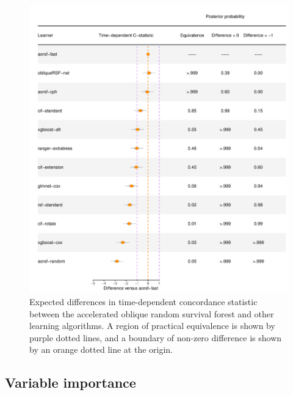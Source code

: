 \documentclass[12pt]{article}\usepackage[]{graphicx}\usepackage[]{xcolor}
\makeatletter
\def\maxwidth{ %
  \ifdim\Gin@nat@width>\linewidth
    \linewidth
  \else
    \Gin@nat@width
  \fi
}
\newenvironment{knitrout}{}{} %
\makeatother
\begin{document}
\begin{knitrout}
\color{fgcolor}\begin{figure}
\includegraphics[width=\maxwidth]{figure/bm_pred_model_viz_cstat-1} \caption[Expected differences in time-dependent concordance statistic between the accelerated oblique random survival forest and other learning algorithms]{Expected differences in time-dependent concordance statistic between the accelerated oblique random survival forest and other learning algorithms. A region of practical equivalence is shown by purple dotted lines, and a boundary of non-zero difference is shown by an orange dotted line at the origin.}\label{fig:bm_pred_model_viz_cstat}
\end{figure}

\end{knitrout}

\subsection{Variable importance} \label{sec:results_vi}
\end{document}
